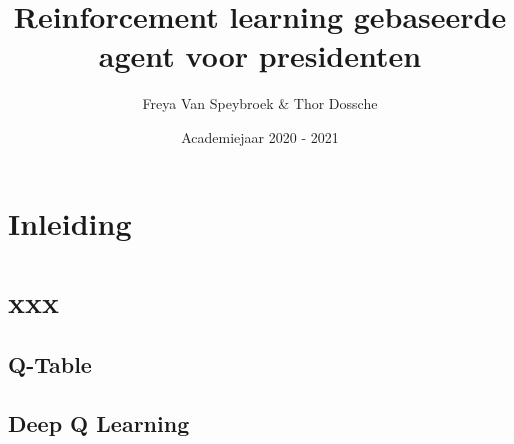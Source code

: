 \documentclass[11pt]{article}
\begin{document}
\begin{titlepage}
\title{Reinforcement learning gebaseerde agent voor presidenten}
\author{Freya Van Speybroek \& Thor Dossche}
\date{Academiejaar 2020 - 2021}
\maketitle
\thispagestyle{empty}
\end{titlepage}


\section{Inleiding}
\section{xxx}
\subsection{Q-Table}
\subsection{Deep Q Learning}
\end{document}

